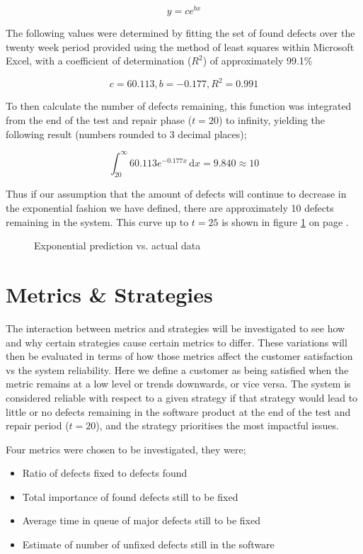 \documentclass[a4paper,10pt]{article}
\begin{document}
$$y = ce^{bx}$$

The following values were determined by fitting the set of found defects over the twenty week period provided using the method of least squares within Microsoft Excel, with a coefficient of determination ($R^2$) of approximately 99.1\%

$$c = 60.113, b = -0.177, R^2 = 0.991$$

To then calculate the number of defects remaining, this function was integrated from the end of the test and repair phase ($t = 20$) to infinity, yielding the following result (numbers rounded to 3 decimal places);

$$\int_{20}^{\infty} \! 60.113 e^{-0.177x} \, \mathrm{d}x = 9.840 \approx 10$$

Thus if our assumption that the amount of defects will continue to decrease in the exponential fashion we have defined, there are approximately 10 defects remaining in the system. This curve up to $t = 25$ is shown in figure \ref{defectdetection} on page \pageref{defectdetection}.

\begin{figure}
  \centering
  
  \caption{Exponential prediction vs. actual data}
  \label{defectdetection}
\end{figure}

\section{Metrics \& Strategies}
The interaction between metrics and strategies will be investigated to see how and why certain strategies cause certain metrics to differ. These variations will then be evaluated in terms of how those metrics affect the customer satisfaction vs the system reliability. Here we define a customer as being satisfied when the metric remains at a low level or trends downwards, or vice versa. The system is considered reliable with respect to a given strategy if that strategy would lead to little or no defects remaining in the software product at the end of the test and repair period ($t = 20$), and the strategy prioritises the most impactful issues.

Four metrics were chosen to be investigated, they were;
\begin{itemize}
 \item Ratio of defects fixed to defects found
 \item Total importance of found defects still to be fixed
 \item Average time in queue of major defects still to be fixed
 \item Estimate of number of unfixed defects still in the software
\end{itemize}
\end{document}
